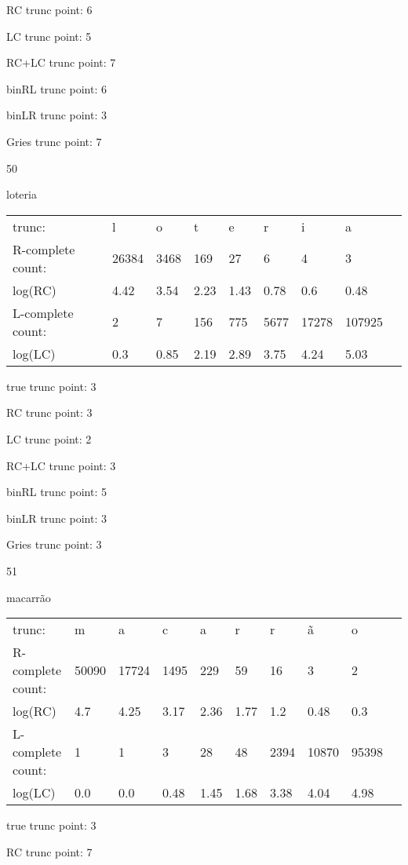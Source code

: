 \documentclass[10pt]{article}
\begin{document}
RC trunc point: 6

LC trunc point: 5

RC+LC trunc point: 7

binRL trunc point: 6

binLR trunc point: 3

Gries trunc point: 7

\vspace{1em}

50

loteria

\begin{tabular}{l|llllllll}
trunc: & l & o & t & e & r & i & a & \\ 
R-complete count: & 26384 & 3468 & 169 & 27 & 6 & 4 & 3 & \\ 
log(RC) & 4.42 & 3.54 & 2.23 & 1.43 & 0.78 & 0.6 & 0.48 & \\ 
L-complete count: & 2 & 7 & 156 & 775 & 5677 & 17278 & 107925 & \\ 
log(LC) & 0.3 & 0.85 & 2.19 & 2.89 & 3.75 & 4.24 & 5.03 & \\ 
\end{tabular}

true trunc point: 3

RC trunc point: 3

LC trunc point: 2

RC+LC trunc point: 3

binRL trunc point: 5

binLR trunc point: 3

Gries trunc point: 3

\vspace{1em}

51

macarrão

\begin{tabular}{l|lllllllll}
trunc: & m & a & c & a & r & r & ã & o & \\ 
R-complete count: & 50090 & 17724 & 1495 & 229 & 59 & 16 & 3 & 2 & \\ 
log(RC) & 4.7 & 4.25 & 3.17 & 2.36 & 1.77 & 1.2 & 0.48 & 0.3 & \\ 
L-complete count: & 1 & 1 & 3 & 28 & 48 & 2394 & 10870 & 95398 & \\ 
log(LC) & 0.0 & 0.0 & 0.48 & 1.45 & 1.68 & 3.38 & 4.04 & 4.98 & \\ 
\end{tabular}

true trunc point: 3

RC trunc point: 7
\end{document}
